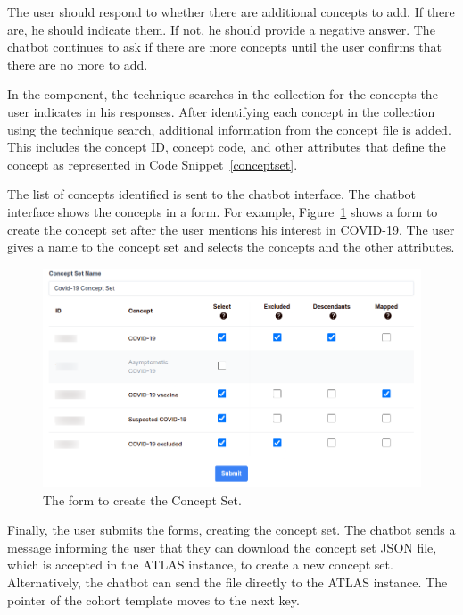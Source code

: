 The user should respond to whether there are additional concepts to add. If there are, he should indicate them. If not, he should provide a negative answer. The chatbot continues to ask if there are more concepts until the user confirms that there are no more to add.

In the {\ir} component, the {\bm} technique searches in the collection for the concepts the user indicates in his responses. After identifying each concept in the collection using the {\ir} technique search, additional information from the concept file is added. This includes the concept ID, concept code, and other attributes that define the concept as represented in Code Snippet~\ref{conceptset}.

The list of concepts identified is sent to the chatbot interface. The chatbot interface shows the concepts in a form. For example, Figure~\ref{fig_forms} shows a form to create the concept set after the user mentions his interest in COVID-19. The user gives a name to the concept set and selects the concepts and the other attributes.


\begin{figure}[H]
  \includegraphics[width=1\textwidth]{figs/chapter4/form.png}
  \centering
  \caption[The form to create the Concept Set]{The form to create the Concept Set.}
  \label{fig_forms}
\end{figure}


Finally, the user submits the forms, creating the concept set. The chatbot sends a message informing the user that they can download the concept set JSON file, which is accepted in the ATLAS instance, to create a new concept set. Alternatively, the chatbot can send the file directly to the ATLAS instance. The pointer of the cohort template moves to the next key.



